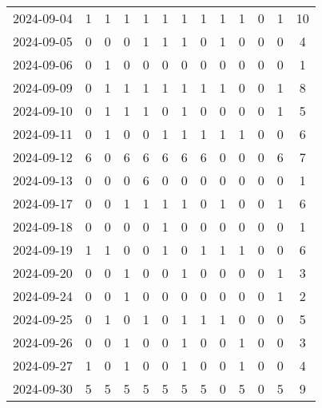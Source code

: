 \documentclass[dvipdfmx,oneside]{article}
\begin{document}
\begin{longtable}{lcccccccccccc}
        2024-09-04 &     1 &     1 &     1 &     1 &     1 &     1 &     1 &     1 &     1 &     0 &     1 &     10 \\
        2024-09-05 &     0 &     0 &     0 &     1 &     1 &     1 &     0 &     1 &     0 &     0 &     0 &      4 \\
        2024-09-06 &     0 &     1 &     0 &     0 &     0 &     0 &     0 &     0 &     0 &     0 &     0 &      1 \\
        2024-09-09 &     0 &     1 &     1 &     1 &     1 &     1 &     1 &     1 &     0 &     0 &     1 &      8 \\
        2024-09-10 &     0 &     1 &     1 &     1 &     0 &     1 &     0 &     0 &     0 &     0 &     1 &      5 \\
        2024-09-11 &     0 &     1 &     0 &     0 &     1 &     1 &     1 &     1 &     1 &     0 &     0 &      6 \\
        2024-09-12 &     6 &     0 &     6 &     6 &     6 &     6 &     6 &     0 &     0 &     0 &     6 &      7 \\
        2024-09-13 &     0 &     0 &     0 &     6 &     0 &     0 &     0 &     0 &     0 &     0 &     0 &      1 \\
        2024-09-17 &     0 &     0 &     1 &     1 &     1 &     1 &     0 &     1 &     0 &     0 &     1 &      6 \\
        2024-09-18 &     0 &     0 &     0 &     0 &     1 &     0 &     0 &     0 &     0 &     0 &     0 &      1 \\
        2024-09-19 &     1 &     1 &     0 &     0 &     1 &     0 &     1 &     1 &     1 &     0 &     0 &      6 \\
        2024-09-20 &     0 &     0 &     1 &     0 &     0 &     1 &     0 &     0 &     0 &     0 &     1 &      3 \\
        2024-09-24 &     0 &     0 &     1 &     0 &     0 &     0 &     0 &     0 &     0 &     0 &     1 &      2 \\
        2024-09-25 &     0 &     1 &     0 &     1 &     0 &     1 &     1 &     1 &     0 &     0 &     0 &      5 \\
        2024-09-26 &     0 &     0 &     1 &     0 &     0 &     1 &     0 &     0 &     1 &     0 &     0 &      3 \\
        2024-09-27 &     1 &     0 &     1 &     0 &     0 &     1 &     0 &     0 &     1 &     0 &     0 &      4 \\
        2024-09-30 &     5 &     5 &     5 &     5 &     5 &     5 &     5 &     0 &     5 &     0 &     5 &      9 \\

\end{longtable}
\end{document}
